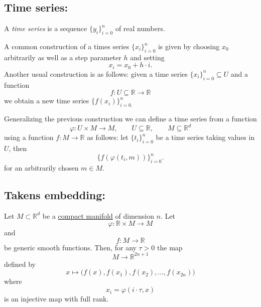 \documentclass{amsart}
\begin{document}
	\subsection*{Time series:} \label{time series}
	
	A \textit{time series} is a sequence $\{y_i\}_{i = 0}^n$ of real numbers. 
	
	A common construction of a times series $\{x_i\}_{i = 0}^n$ is given by choosing $x_0$ arbitrarily as well as a step parameter $h$ and setting
	\begin{equation*}
	x_i = x_0 + h\cdot i.
	\end{equation*}
	Another usual construction is as follows: given a time series $\{x_i\}_{i = 0}^n \subseteq U$ and a  function
	\begin{equation*}
	f :  U \subseteq \mathbb R \to \mathbb R
	\end{equation*}
	we obtain a new time series $\{f(x_i)\}_{i = 0.}^n$
	
	Generalizing the previous construction we can define a time series from a function 
	\begin{equation*}
	\varphi : U  \times M \to M, \qquad U \subseteq \mathbb R, \qquad M \subseteq \mathbb R^d
	\end{equation*} 
	using a function $f : M \to \mathbb R$ as follows: let $\{t_i\}_{i=0}^n$ be a time series taking values in $U$, then
	\begin{equation*}
	\{f(\varphi(t_i, m))\}_{i=0}^n.
	\end{equation*}
	for an arbitrarily chosen $m \in M$.
	
	\subsection*{Takens embedding:}	\label{takens embedding}
	
	Let $M \subset \mathbb R^d$ be a \hyperref[manifold]{compact manifold} of dimension $n$. Let
	\begin{equation*}
	\varphi : \mathbb R  \times M \to M
	\end{equation*} 
	and
	\begin{equation*}
	f : M \to \mathbb R
	\end{equation*}
	be generic smooth functions. Then, for any $\tau > 0$ the map
	\begin{equation*}
	M \to \mathbb R^{2n+1}
	\end{equation*}
	defined by
	\begin{equation*}
	x \mapsto\big( f(x), f(x_1), f(x_2), \dots, f(x_{2n}) \big)
	\end{equation*}
	where 
	\begin{equation*}
	x_i = \varphi(i \cdot \tau, x)
	\end{equation*}
	is an injective map with full rank. 
  
\end{document}
